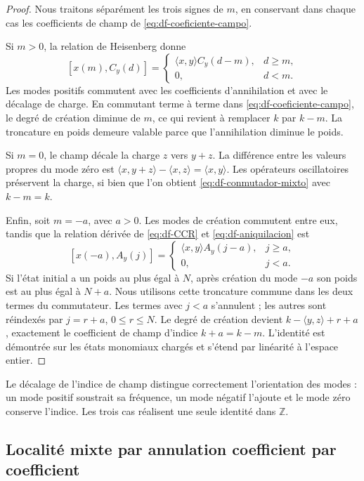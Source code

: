 \begin{proof}
Nous traitons séparément les trois signes de \(m\), en conservant dans chaque cas les coefficients de champ de \eqref{eq:df-coeficiente-campo}.

Si \(m>0\), la relation de Heisenberg donne
\[
 [x(m),C_y(d)]=
 \begin{cases}
 \langle x,y\rangle C_y(d-m),&d\geq m,\\
 0,&d<m.
 \end{cases}
\]
Les modes positifs commutent avec les coefficients d’annihilation et avec le décalage de charge. En commutant terme à terme dans \eqref{eq:df-coeficiente-campo}, le degré de création diminue de \(m\), ce qui revient à remplacer \(k\) par \(k-m\). La troncature en poids demeure valable parce que l’annihilation diminue le poids.

Si \(m=0\), le champ décale la charge \(z\) vers \(y+z\). La différence entre les valeurs propres du mode zéro est \(\langle x,y+z\rangle-\langle x,z\rangle=\langle x,y\rangle\). Les opérateurs oscillatoires préservent la charge, si bien que l’on obtient \eqref{eq:df-conmutador-mixto} avec \(k-m=k\).

Enfin, soit \(m=-a\), avec \(a>0\). Les modes de création commutent entre eux, tandis que la relation dérivée de \eqref{eq:df-CCR} et \eqref{eq:df-aniquilacion} est
\[
 [x(-a),A_y(j)]=
 \begin{cases}
 \langle x,y\rangle A_y(j-a),&j\geq a,\\
 0,&j<a.
 \end{cases}
\]
Si l’état initial a un poids au plus égal à \(N\), après création du mode \(-a\) son poids est au plus égal à \(N+a\). Nous utilisons cette troncature commune dans les deux termes du commutateur. Les termes avec \(j<a\) s’annulent ; les autres sont réindexés par \(j=r+a\), \(0\leq r\leq N\). Le degré de création devient \(k-\langle y,z\rangle+r+a\), exactement le coefficient de champ d’indice \(k+a=k-m\). L’identité est démontrée sur les états monomiaux chargés et s’étend par linéarité à l’espace entier.
\end{proof}

Le décalage de l’indice de champ distingue correctement l’orientation des modes : un mode positif soustrait sa fréquence, un mode négatif l’ajoute et le mode zéro conserve l’indice. Les trois cas réalisent une seule identité dans \(\mathbb Z\).

\subsection{Localité mixte par annulation coefficient par coefficient}
\label{subsec:df-localidad-mixta}

